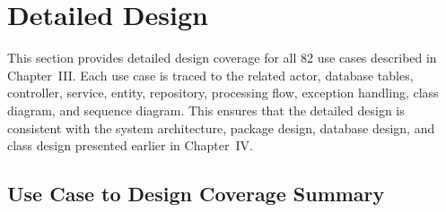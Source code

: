 \providecommand{\SequenceDiagram}[7]{
\begin{figure}[H]
\centering
\resizebox{\textwidth}{!}{
\begin{tikzpicture}
    \node[participant] (actor) at (0,0) {#2};
    \node[participant] (ui) at (2.8,0) {Web UI};
    \node[participant] (controller) at (5.6,0) {#4};
    \node[participant] (service) at (8.4,0) {#5};
    \node[participant] (repo) at (11.2,0) {#6};
    \node[participant] (ext) at (14.0,0) {Database/API};

    \foreach \x in {0,2.8,5.6,8.4,11.2,14.0} {
        \draw[sequenceline] (\x,-0.35) -- (\x,-7.1);
    }

    \draw[seqmessage] (0,-0.8) -- node[above,font=\scriptsize]{1. #3} (2.8,-0.8);
    \draw[seqmessage] (2.8,-1.55) -- node[above,font=\scriptsize]{2. submit request} (5.6,-1.55);
    \draw[seqmessage] (5.6,-2.3) -- node[above,font=\scriptsize]{3. validate and call service} (8.4,-2.3);
    \draw[seqmessage] (8.4,-3.05) -- node[above,font=\scriptsize]{4. load or save data} (11.2,-3.05);
    \draw[seqmessage] (11.2,-3.8) -- node[above,font=\scriptsize]{5. query/update} (14.0,-3.8);
    \draw[seqreturn] (11.2,-4.55) -- node[above,font=\scriptsize]{6. return data} (14.0,-4.55);
    \draw[seqreturn] (8.4,-5.3) -- node[above,font=\scriptsize]{7. build result} (11.2,-5.3);
    \draw[seqreturn] (5.6,-6.05) -- node[above,font=\scriptsize]{8. return response} (8.4,-6.05);
    \draw[seqreturn] (2.8,-6.8) -- node[above,font=\scriptsize]{9. #7} (5.6,-6.8);
\end{tikzpicture}
}
\caption{Sequence diagram for #1}
\end{figure}
}

\section{Detailed Design}

This section provides detailed design coverage for all 82 use cases described in Chapter~III. Each use case is traced to the related actor, database tables, controller, service, entity, repository, processing flow, exception handling, class diagram, and sequence diagram. This ensures that the detailed design is consistent with the system architecture, package design, database design, and class design presented earlier in Chapter~IV.

\subsection{Use Case to Design Coverage Summary}

